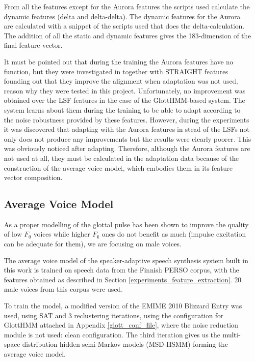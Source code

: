 From all the features except for the Aurora features the scripts used calculate the dynamic features (delta and delta-delta). 
%
The dynamic features for the Aurora are calculated with a snippet of the scripts used that does the delta-calculation.
%
The addition of all the static and dynamic features gives the 183-dimension of the final feature vector.

It must be pointed out that during the training the Aurora features have no function, but they were investigated in \cite{karhila_jstsp_14} together with STRAIGHT features founding out that they improve the alignment when adaptation was not used, reason why they were tested in this project.
%
Unfortunately, no improvement was obtained over the LSF features in the case of the GlottHMM-based system.
%
The system learns about them during the training to be able to adapt according to the noise robustness provided by these features.
%
However, during the experiments it was discovered that adapting with the Aurora features in stead of the LSFs not only does not produce any improvements but the results were clearly poorer.
%
This was obviously noticed after adapting. 
%
Therefore, although the Aurora features are not used at all, they must be calculated in the adaptation data because of the construction of the average voice model, which embodies them in its feature vector composition.

\subsection{Average Voice Model}
\label{experiments_av_voice_model}
As a proper modelling of the glottal pulse has been shown to improve the quality of low $F_{0}$ voices while higher $F_{0}$ ones do not benefit as much (impulse excitation can be adequate for them), we are focusing on male voices.

The average voice model of the speaker-adaptive speech synthesis system built in this work is trained on speech data from the Finnish PERSO corpus, with the features obtained as described in Section \ref{experiments_feature_extraction}.
%
20 male voices from this corpus were used.

To train the model, a modified version of the EMIME 2010 Blizzard Entry \cite{emime_blizzard} was used, using SAT and 3 reclustering iterations, using the configuration for GlottHMM attached in Appendix \ref{glott_conf_file}, where the noise reduction module is not used: clean configuration. 
%
The third iteration gives us the multi-space distribution hidden semi-Markov models (MSD-HSMM) forming the average voice model.

